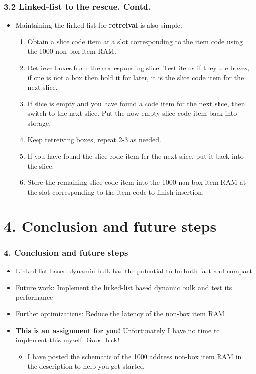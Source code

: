 \documentclass[aspectratio=169]{beamer}
\begin{document}
\begin{frame}
	\frametitle{3.2 Linked-list to the rescue. Contd.}

    \begin{itemize}
        \item Maintaining the linked list for \textbf{retreival} is also simple.
        \begin{enumerate}
            \item Obtain a slice code item at a slot corresponding to the item code using the 1000 non-box-item RAM.
            \item Retrieve boxes from the corresponding slice. Test items if they are boxes, if one is not a box then hold it for later, it is the slice code item for the next slice.
            \item If slice is empty and you have found a code item for the next slice, then switch to the next slice. Put the now empty slice code item back into storage.
            \item Keep retreiving boxes, repeat 2-3 as needed.
            \item If you have found the slice code item for the next slice, put it back into the slice.
            \item Store the remaining slice code item into the 1000 non-box-item RAM at the slot corresponding to the item code to finish insertion.
        \end{enumerate}
    \end{itemize}
\end{frame}

\section{4. Conclusion and future steps}

\begin{frame}
    \frametitle{4. Conclusion and future steps}

    \begin{itemize}
        \item Linked-list based dynamic bulk has the potential to be both fast and compact
        \item Future work: Implement the linked-list based dynamic bulk and test its performance
        \item Further optimizations: Reduce the latency of the non-box item RAM
        \item \textbf{This is an assignment for you!} Unfortunately I have no time to implement this myself. Good luck!
        \begin{itemize}
            \item I have posted the schematic of the 1000 address non-box item RAM in the description to help you get started
        \end{itemize}
    \end{itemize}
\end{frame}
\end{document}
